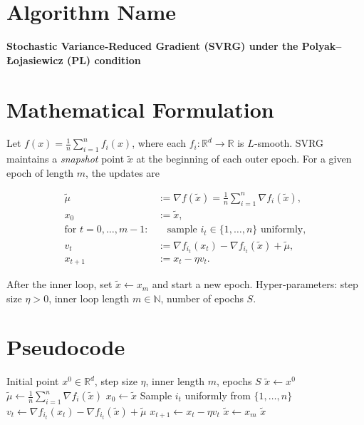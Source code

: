 \documentclass{article}
\newcommand{\R}{\mathbb{R}}
\begin{document}
\section*{Algorithm Name}
\textbf{Stochastic Variance‑Reduced Gradient (SVRG) under the Polyak–Łojasiewicz (PL) condition}

\section*{Mathematical Formulation}
Let $f(x)=\frac{1}{n}\sum_{i=1}^{n} f_i(x)$, where each $f_i:\R^{d}\rightarrow\R$ is $L$‑smooth.  
SVRG maintains a \emph{snapshot} point $\tilde{x}$ at the beginning of each outer epoch.  
For a given epoch of length $m$, the updates are

\[
\begin{aligned}
\tilde{\mu} &:= \nabla f(\tilde{x})=\frac{1}{n}\sum_{i=1}^{n}\nabla f_i(\tilde{x}) ,\\[4pt]
x_{0} &:= \tilde{x},\\[4pt]
\text{for }t=0,\dots ,m-1:&\quad 
\text{sample } i_t\in\{1,\dots ,n\}\text{ uniformly},\\
v_{t} &:= \nabla f_{i_t}(x_{t})-\nabla f_{i_t}(\tilde{x})+\tilde{\mu},\\
x_{t+1} &:= x_{t}-\eta v_{t}.
\end{aligned}
\]

After the inner loop, set $\tilde{x}\leftarrow x_{m}$ and start a new epoch.  
Hyper‑parameters: step size $\eta>0$, inner loop length $m\in\mathbb{N}$, number of epochs $S$.

\section*{Pseudocode}
\begin{algorithm}[H]
\caption{SVRG under PL}
\begin{algorithmic}[1]
\REQUIRE Initial point $x^{0}\in\R^{d}$, step size $\eta$, inner length $m$, epochs $S$
\STATE $\tilde{x}\gets x^{0}$
    \STATE $\tilde{\mu}\gets \frac{1}{n}\sum_{i=1}^{n}\nabla f_i(\tilde{x})$ 
    \STATE $x_{0}\gets \tilde{x}$
        \STATE Sample $i_{t}$ uniformly from $\{1,\dots ,n\}$
        \STATE $v_{t}\gets \nabla f_{i_t}(x_{t})-\nabla f_{i_t}(\tilde{x})+\tilde{\mu}$
        \STATE $x_{t+1}\gets x_{t}-\eta v_{t}$
    \ENDFOR
    \STATE $\tilde{x}\gets x_{m}$ 
\ENDFOR
\RETURN $\tilde{x}$
\end{algorithmic}
\end{algorithm}
\end{document}
